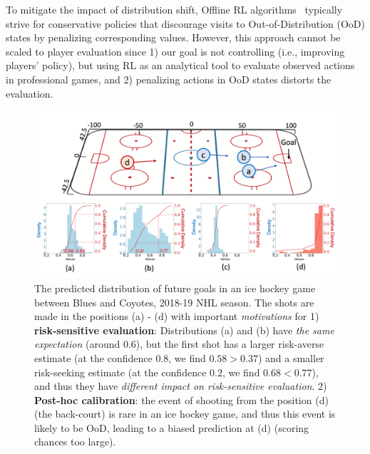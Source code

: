 \documentclass[letterpaper]{article} %
\begin{document}
To mitigate the impact of distribution shift, Offline RL algorithms~\cite{Levine2020OfflineRL} typically strive for conservative policies that discourage visits to Out-of-Distribution (OoD) states by penalizing corresponding values. However, this approach cannot be scaled to player evaluation since 1) our goal is not controlling (i.e., improving players' policy), but using RL as an analytical tool to evaluate observed actions in professional games, and 2) penalizing actions in OoD states distorts the evaluation.


\begin{figure}
    \centering
    \includegraphics[scale=0.35]{figures/ice-hockey-rink-marked.png}
    \vspace{-0.15in}
    \caption{
    The predicted distribution of future goals in an ice hockey game between Blues and Coyotes, 2018-19 NHL season. The shots are made in the positions (a) - (d) with important {\it motivations} for 1) {\bf risk-sensitive evaluation}: Distributions (a) and (b) have {\it the same expectation} (around 0.6), but the first shot has a larger risk-averse estimate (at the confidence $0.8$, we find $0.58 > 0.37$) and a smaller risk-seeking estimate (at the confidence $0.2$, we find $0.68 < 0.77$), and thus they have {\it different impact on risk-sensitive evaluation}. 2) {\bf Post-hoc calibration}: the event of shooting from the position (d) (the back-court) is rare in an ice hockey game, and thus this event is likely to be OoD, leading to a biased prediction at (d) (scoring chances too large).
    }
    \label{fig:examples-distribution-ice-hockey}
    \vspace{-0.15in}
\end{figure}
\end{document}
